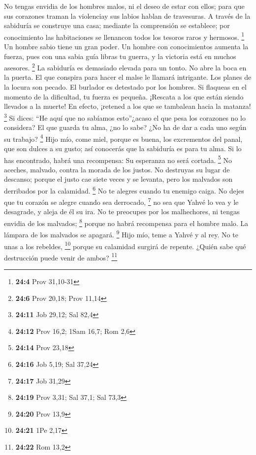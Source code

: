  No tengas envidia de los hombres malos, ni el deseo de
estar con ellos;  para que sus corazones traman la
violenciay sus labios hablan de travesuras.  A través de
la sabiduría se construye una casa; mediante la comprensión se
establece;  por conocimiento las habitaciones se llenancon
todos los tesoros raros y hermosos. \footnote{\textbf{24:4} Prov
  31,10-31}  Un hombre sabio tiene un gran poder. Un
hombre con conocimientos aumenta la fuerza,  pues con una
sabia guía libras tu guerra, y la victoria está en muchos asesores.
\footnote{\textbf{24:6} Prov 20,18; Prov 11,14}  La
sabiduría es demasiado elevada para un tonto. No abre la boca en la
puerta.  El que conspira para hacer el malse le llamará
intrigante.  Los planes de la locura son pecado. El
burlador es detestado por los hombres.  Si flaqueas en el
momento de la dificultad, tu fuerza es pequeña.  ¡Rescata
a los que están siendo llevados a la muerte! En efecto, ¡retened a los
que se tambalean hacia la matanza! \footnote{\textbf{24:11} Job 29,12;
  Sal 82,4}  Si dices: ``He aquí que no sabíamos
esto''¿acaso el que pesa los corazones no lo considera? El que guarda tu
alma, ¿no lo sabe? ¿No ha de dar a cada uno según su trabajo?
\footnote{\textbf{24:12} Prov 16,2; 1Sam 16,7; Rom 2,6} 
Hijo mío, come miel, porque es buena, los excrementos del panal, que son
dulces a su gusto;  así conocerás que la sabiduría es
para tu alma. Si lo has encontrado, habrá una recompensa: Su esperanza
no será cortada. \footnote{\textbf{24:14} Prov 23,18}  No
aceches, malvado, contra la morada de los justos. No destruyas su lugar
de descanso;  porque el justo cae siete veces y se
levanta, pero los malvados son derribados por la calamidad. \footnote{\textbf{24:16}
  Job 5,19; Sal 37,24}  No te alegres cuando tu enemigo
caiga. No dejes que tu corazón se alegre cuando sea derrocado,
\footnote{\textbf{24:17} Job 31,29}  no sea que Yahvé lo
vea y le desagrade, y aleja de él su ira.  No te
preocupes por los malhechores, ni tengas envidia de los malvados;
\footnote{\textbf{24:19} Prov 3,31; Sal 37,1; Sal 73,3} 
porque no habrá recompensa para el hombre malo. La lámpara de los
malvados se apagará. \footnote{\textbf{24:20} Prov 13,9} 
Hijo mío, teme a Yahvé y al rey. No te unas a los rebeldes, \footnote{\textbf{24:21}
  1Pe 2,17}  porque su calamidad surgirá de repente.
¿Quién sabe qué destrucción puede venir de ambos? \footnote{\textbf{24:22}
  Rom 13,2}

